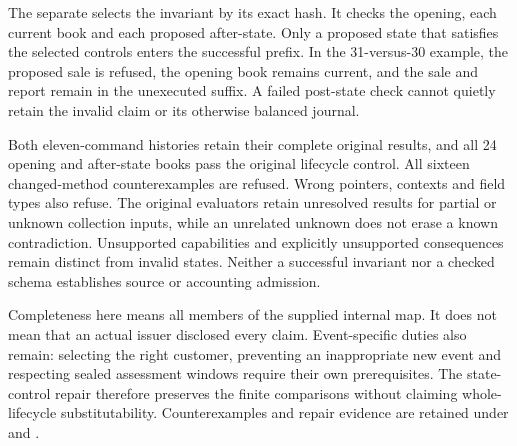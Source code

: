 The separate  selects the invariant by
its exact hash. It checks the opening, each current book and each proposed
after-state. Only a proposed state that satisfies the selected controls enters
the successful prefix. In the 31-versus-30 example, the proposed sale is
refused, the opening book remains current, and the sale and report remain in
the unexecuted suffix. A failed post-state check cannot quietly retain the
invalid claim or its otherwise balanced journal.

Both eleven-command histories retain their complete original results, and
all 24 opening and after-state books pass the original lifecycle control.
All sixteen changed-method counterexamples are refused. Wrong pointers,
contexts and field types also refuse. The original evaluators retain unresolved
results for partial or unknown collection inputs, while an unrelated unknown
does not erase a known contradiction. Unsupported capabilities and explicitly
unsupported consequences remain distinct from invalid states. Neither a
successful invariant nor a checked schema establishes source or accounting
admission.

Completeness here means all members of the supplied internal map. It does not
mean that an actual issuer disclosed every claim. Event-specific duties also
remain: selecting the right customer, preventing an inappropriate new event
and respecting sealed assessment windows require their own prerequisites.
The state-control repair therefore preserves the finite comparisons without
claiming whole-lifecycle substitutability. Counterexamples and repair evidence
are retained under
 and
.


